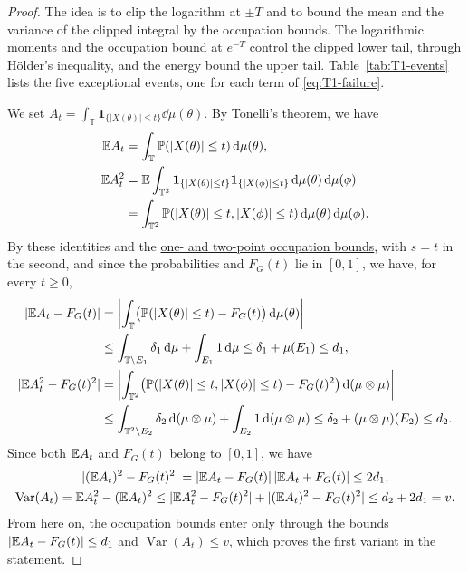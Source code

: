 \begin{proof}
The idea is to clip the logarithm at $\pm T$ and to bound the mean and
the variance of the clipped integral by the occupation bounds. The
logarithmic moments and the occupation bound at $e^{-T}$ control the
clipped lower tail, through H\"older's inequality, and the energy bound
the upper tail.
Table~\ref{tab:T1-events} lists the five exceptional events, one for
each term of \eqref{eq:T1-failure}.

We set
$A_t=\int_{\mathbb T}\boldsymbol1_{\{|X(\theta)|\leq t\}}\dd\mu(\theta)$.
By Tonelli's theorem, we have
\begin{align*}
 \mathbb E A_t
 &=\int_{\mathbb T}\mathbb P(|X(\theta)|\leq t)\,\mathrm d\mu(\theta),\\
 \mathbb E A_t^2
 &=\mathbb E\int_{\mathbb T^2}
      \boldsymbol1_{\{|X(\theta)|\leq t\}}
      \boldsymbol1_{\{|X(\phi)|\leq t\}}\,\mathrm d\mu(\theta)\,\mathrm d\mu(\phi)\\
 &=\int_{\mathbb T^2}
      \mathbb P(|X(\theta)|\leq t,|X(\phi)|\leq t)
         \,\mathrm d\mu(\theta)\,\mathrm d\mu(\phi).
\end{align*}
By these identities and the
\hyperref[hyp:occupation]{one- and two-point occupation bounds}, with $s=t$
in the second, and since the probabilities and $F_G(t)$ lie in $[0,1]$, we
have, for every $t\geq0$,
\begin{align*}
 |\mathbb E A_t-F_G(t)|
 &=\left|\int_{\mathbb T}\bigl(\mathbb P(|X(\theta)|\leq t)-F_G(t)\bigr)
       \,\mathrm d\mu(\theta)\right|\\
 &\leq\int_{\mathbb T\setminus E_1}\delta_1\,\mathrm d\mu
       +\int_{E_1}1\,\mathrm d\mu
 \leq\delta_1+\mu(E_1)
 \leq d_1,\\
 |\mathbb E A_t^2-F_G(t)^2|
 &=\left|\int_{\mathbb T^2}\bigl(\mathbb P(|X(\theta)|\leq t,|X(\phi)|\leq t)
       -F_G(t)^2\bigr)\,\mathrm d(\mu\otimes\mu)\right|\\
 &\leq\int_{\mathbb T^2\setminus E_2}\delta_2\,\mathrm d(\mu\otimes\mu)
       +\int_{E_2}1\,\mathrm d(\mu\otimes\mu)
 \leq\delta_2+(\mu\otimes\mu)(E_2)
 \leq d_2.
\end{align*}
Since both $\mathbb E A_t$ and $F_G(t)$ belong to $[0,1]$, we have
\begin{gather*}
 |(\mathbb E A_t)^2-F_G(t)^2|
 =|\mathbb E A_t-F_G(t)|\,|\mathbb E A_t+F_G(t)|
 \leq2d_1,\\
 \operatorname{Var}(A_t)
 =\mathbb E A_t^2-(\mathbb E A_t)^2
 \leq|\mathbb E A_t^2-F_G(t)^2|+|(\mathbb E A_t)^2-F_G(t)^2|
 \leq d_2+2d_1
 =v.
\end{gather*}
From here on, the occupation bounds enter only through the bounds
$|\mathbb E A_t-F_G(t)|\leq d_1$ and $\operatorname{Var}(A_t)\leq v$, which
proves the first variant in the statement.


\end{proof}
